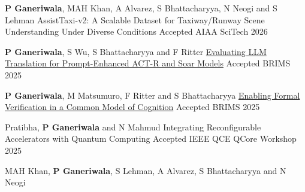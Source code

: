 \begin{cventries}
{}
% 
\cventry
{\textbf{P Ganeriwala}, MAH Khan, A Alvarez, S Bhattacharyya, N Neogi and S Lehman}
{AssistTaxi-v2: A Scalable Dataset for Taxiway/Runway Scene Understanding Under Diverse Conditions}
{Accepted}
{AIAA SciTech 2026} 
{ %
\begin{cvitems}
\end{cvitems}
}
\cventry
{\textbf{P Ganeriwala}, S Wu, S Bhattacharyya and F Ritter}
{
\href{https://sbp-brims.org/2025/papers/working-papers/2025_SBP-BRiMS_paper_26.pdf}{Evaluating LLM Translation for Prompt-Enhanced ACT-R and Soar Models}}
{Accepted}
{BRIMS 2025} 
{ %
\begin{cvitems}
\end{cvitems}
}
\cventry
{\textbf{P Ganeriwala}, M Matsumuro, F Ritter and S Bhattacharyya}
{
\href{https://sbp-brims.org/2025/papers/working-papers/2025_SBP-BRiMS_paper_18.pdf}{Enabling Formal Verification in a Common Model of Cognition}}
{Accepted}
{BRIMS 2025} 
{ %
\begin{cvitems}
\end{cvitems}
}
\cventry
{Pratibha, \textbf{P Ganeriwala} and N Mahmud}
{Integrating Reconfigurable Accelerators with Quantum Computing}
{Accepted}
{IEEE QCE QCore Workshop 2025} 
{ %
\begin{cvitems}
\end{cvitems}
}
\cventry
{MAH Khan, \textbf{P Ganeriwala}, S Lehman, A Alvarez, S Bhattacharyya and N Neogi}

\end{cventries}
